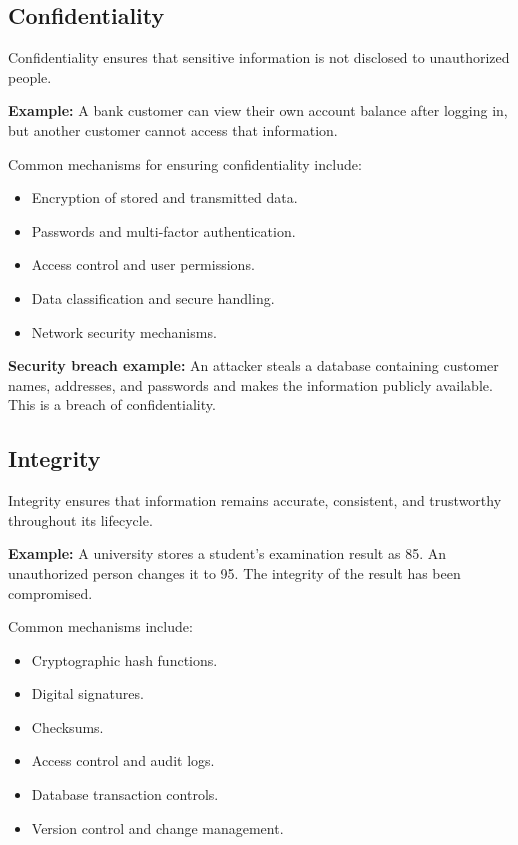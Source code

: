 \subsection{Confidentiality}

Confidentiality ensures that sensitive information is not disclosed to unauthorized people.

\textbf{Example:} A bank customer can view their own account balance after logging in, but another customer cannot access that information.

Common mechanisms for ensuring confidentiality include:

\begin{itemize}
\item Encryption of stored and transmitted data.
\item Passwords and multi-factor authentication.
\item Access control and user permissions.
\item Data classification and secure handling.
\item Network security mechanisms.
\end{itemize}

\textbf{Security breach example:} An attacker steals a database containing customer names, addresses, and passwords and makes the information publicly available. This is a breach of confidentiality.

\subsection{Integrity}

Integrity ensures that information remains accurate, consistent, and trustworthy throughout its lifecycle.

\textbf{Example:} A university stores a student's examination result as 85. An unauthorized person changes it to 95. The integrity of the result has been compromised.

Common mechanisms include:

\begin{itemize}
\item Cryptographic hash functions.
\item Digital signatures.
\item Checksums.
\item Access control and audit logs.
\item Database transaction controls.
\item Version control and change management.
\end{itemize}

